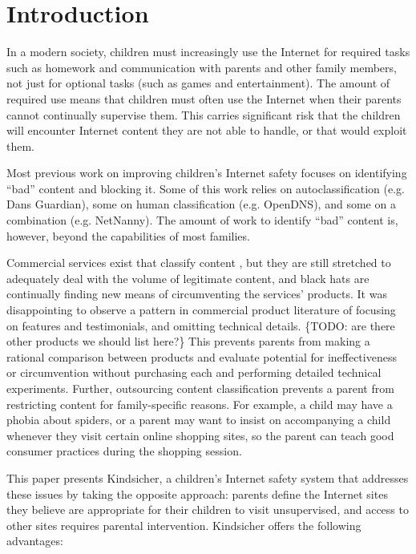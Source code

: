 
\section{Introduction}

In a modern society, children must increasingly use the Internet for required
tasks such as homework and communication with parents and other family
members, not just for optional tasks (such as games and entertainment). 
%
The amount of required use means that children must often use the Internet
when their parents cannot continually supervise them. 
%
This carries significant risk that the children will encounter Internet
content they are not able to handle, or that would exploit them. 

Most previous work on improving children's Internet safety focuses on
identifying ``bad'' content and blocking it. Some of this work relies
on autoclassification (e.g. Dans Guardian\cite{dansguardian}), some on
human classification (e.g. OpenDNS\cite{opendns}), and some on a
combination (e.g. NetNanny\cite{netnanny}).
%
The amount of work to identify ``bad'' content is, however, beyond the
capabilities of most families.

Commercial services exist that classify content \cite{opendns}\cite{netnanny},
but they are still stretched to adequately deal with the volume of legitimate
content, and black hats are continually finding new means of circumventing the
services' products.
%
It was disappointing to observe a pattern in commercial product literature of
focusing on features and testimonials, and omitting technical
details.\cite{opendns} \{TODO: are there other products we should list here?\}
%
This prevents parents from making a rational comparison between
products and evaluate potential for ineffectiveness or circumvention
without purchasing each and performing detailed technical experiments.
%
Further, outsourcing content classification prevents a parent from restricting
content for family-specific reasons. 
%
For example, a child may have a phobia about spiders, or a parent may want to
insist on accompanying a child whenever they visit certain online shopping
sites, so the parent can teach good consumer practices during the shopping
session. 

This paper presents Kindsicher, a children's Internet safety system
that addresses these issues by taking the opposite approach: parents
define the Internet sites they believe are appropriate for their
children to visit unsupervised, and access to other sites requires
parental intervention.
%
Kindsicher offers the following advantages:

